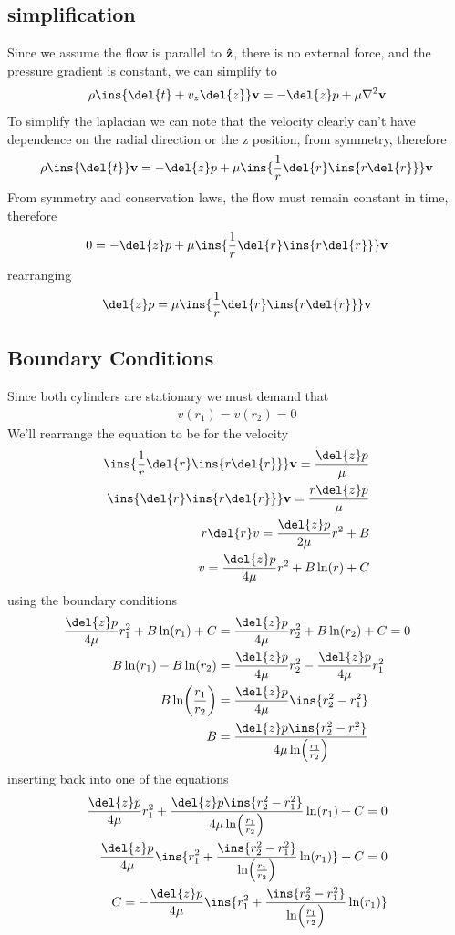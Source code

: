 \subsection{simplification}
Since we assume the flow is parallel to \(\vu{z}\), there is no external force, and the pressure gradient is constant, we can simplify to
\begin{equation}
    \rho\ins{\del{t}+v_z\del{z}}\vb{v} = -\del{z}p+\mu\laplacian{\vb{v}}
\end{equation}
To simplify the laplacian we can note that the velocity clearly can't have dependence on the radial direction or the z position, from symmetry, therefore
\begin{equation}
    \rho\ins{\del{t}}\vb{v} = -\del{z}p+\mu\ins{\frac{1}{r}\del{r}\ins{r\del{r}}}\vb{v}
\end{equation}
From symmetry and conservation laws, the flow must remain constant in time, therefore
\begin{equation}
    0 = -\del{z}p+\mu\ins{\frac{1}{r}\del{r}\ins{r\del{r}}}\vb{v}
\end{equation}
rearranging
\begin{equation}
    \del{z}p = \mu\ins{\frac{1}{r}\del{r}\ins{r\del{r}}}\vb{v}
\end{equation}
\subsection{Boundary Conditions}
Since both cylinders are stationary we must demand that 
\begin{align}
    v(r_1)=v(r_2)=0
\end{align}
We'll rearrange the equation to be for the velocity
\begin{align}
     \ins{\frac{1}{r}\del{r}\ins{r\del{r}}}\vb{v}=\frac{\del{z}p}{\mu} \\
     \ins{\del{r}\ins{r\del{r}}}\vb{v}=\frac{r\del{z}p}{\mu} \\
     r\del{r}v = \frac{\del{z}p}{2\mu}r^2+B \\
     v = \frac{\del{z}p}{4\mu}r^2+B\ln(r)+C
\end{align}
using the boundary conditions
\begin{align}
    \frac{\del{z}p}{4\mu}r_1^2+B\ln(r_1)+C &= \frac{\del{z}p}{4\mu}r_2^2+B\ln(r_2)+C = 0 \\
    B\ln(r_1)-B\ln(r_2) &= \frac{\del{z}p}{4\mu}r_2^2-\frac{\del{z}p}{4\mu}r_1^2 \\
    B\ln(\frac{r_1}{r_2})&=\frac{\del{z}p}{4\mu}\ins{r_2^2-r_1^2} \\
    B &= \frac{\del{z}p\ins{r_2^2-r_1^2}}{4\mu\ln(\frac{r_1}{r_2})}
\end{align}
inserting back into one of the equations
\begin{align}
    \frac{\del{z}p}{4\mu}r_1^2+\frac{\del{z}p\ins{r_2^2-r_1^2}}{4\mu\ln(\frac{r_1}{r_2})}\ln(r_1)+C = 0 \\
    \frac{\del{z}p}{4\mu}\ins{r_1^2+\frac{\ins{r_2^2-r_1^2}}{\ln(\frac{r_1}{r_2})}\ln(r_1)}+C = 0 \\
    C = -\frac{\del{z}p}{4\mu}\ins{r_1^2+\frac{\ins{r_2^2-r_1^2}}{\ln(\frac{r_1}{r_2})}\ln(r_1)}
\end{align}

